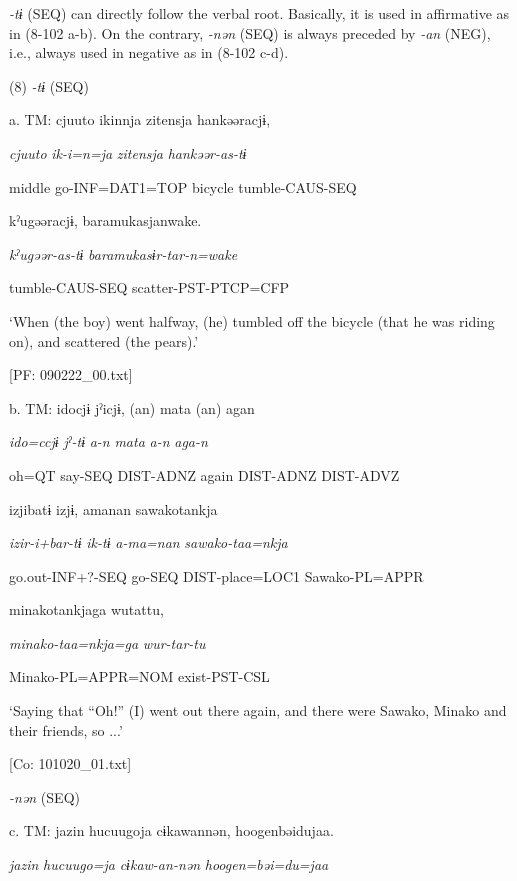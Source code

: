 \textit{{}-tɨ} (SEQ) can directly follow the verbal root. Basically, it is used in affirmative as in (8-102 a-b). On the contrary, \textit{{}-nən} (SEQ) is always preceded by \textit{{}-an} (NEG), i.e., always used in negative as in (8-102 c-d).

(8)  \textit{{}-tɨ} (SEQ)

  a.  TM:  cjuuto  ikinnja  {\textbar}zitensja{\textbar}  hankəəracjɨ,

      \textit{cjuuto}  \textit{ik-i=n=ja}  \textit{zitensja}  \textit{hankəər-as-tɨ}

      middle  go-INF=DAT1=TOP  bicycle  tumble-CAUS-SEQ

      kˀugəəracjɨ,  baramukasjanwake.

      \textit{kˀugəər-as-tɨ}  \textit{baramukasɨr-tar-n=wake}

      tumble-CAUS-SEQ  scatter-PST-PTCP=CFP

      ‘When (the boy) went halfway, (he) tumbled off the bicycle (that he was riding on), and scattered (the pears).’

      [PF: 090222\_00.txt]

  b.  TM:  idocjɨ  jˀicjɨ,  (an)  mata  (an)  agan

      \textit{ido=ccjɨ}  \textit{jˀ-tɨ}  \textit{a-n}  \textit{mata}  \textit{a-n}  \textit{aga-n}

      oh=QT  say-SEQ  DIST-ADNZ  again  DIST-ADNZ  DIST-ADVZ

      izjibatɨ  izjɨ,  amanan  sawakotankja

      \textit{izir-i+bar-tɨ}  \textit{ik-tɨ}  \textit{a-ma=nan}  \textit{sawako-taa=nkja}

      go.out-INF+?-SEQ  go-SEQ  DIST-place=LOC1  Sawako-PL=APPR

      minakotankjaga  wutattu,

      \textit{minako-taa=nkja=ga}  \textit{wur-tar-tu}

      Minako-PL=APPR=NOM  exist-PST-CSL

      ‘Saying that “Oh!” (I) went out there again, and there were Sawako, Minako and their friends, so ...’

      [Co: 101020\_01.txt]

  \textit{{}-nən} (SEQ)

  c.  TM:  jazin  {\textbar}hucuugo{\textbar}ja  cɨkawannən,  {\textbar}hoogen{\textbar}bəidujaa.

      \textit{jazin}  \textit{hucuugo=ja}  \textit{cɨkaw-an-nən}  \textit{hoogen=bəi=du=jaa}

